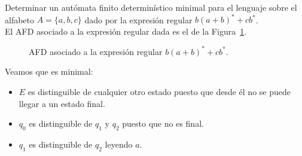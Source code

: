 \begin{ejercicio}\label{ej:1.3.17}
    Determinar un autómata finito determinístico minimal para el lenguaje sobre el alfabeto $A=\{a,b,c\}$ dado por la expresión regular $b{(a+b)}^{\ast}+cb^\ast$.\\

    El AFD asociado a la expresión regular dada es el de la Figura~\ref{fig:1.3.17-AFD}.
    \begin{figure}
        \centering
        \caption{AFD asociado a la expresión regular $b{(a+b)}^{\ast}+cb^\ast$.}
        \label{fig:1.3.17-AFD}
    \end{figure}

    Veamos que es minimal:
    \begin{itemize}
        \item $E$ es distinguible de cualquier otro estado puesto que desde él no se puede llegar a un estado final.
        \item $q_0$ es distinguible de $q_1$ y $q_2$ puesto que no es final.
        \item $q_1$ es distinguible de $q_2$ leyendo $a$.
    \end{itemize}
\end{ejercicio}


